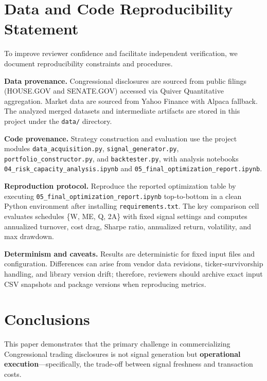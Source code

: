 \documentclass[twocolumn,ieee]{Base_Latex_Template/arithmaxresearch}
\begin{document}
\section{Data and Code Reproducibility Statement}

To improve reviewer confidence and facilitate independent verification, we document reproducibility constraints and procedures.

\textbf{Data provenance.} Congressional disclosures are sourced from public filings (HOUSE.GOV and SENATE.GOV) accessed via Quiver Quantitative aggregation. Market data are sourced from Yahoo Finance with Alpaca fallback. The analyzed merged datasets and intermediate artifacts are stored in this project under the \texttt{data/} directory.

\textbf{Code provenance.} Strategy construction and evaluation use the project modules \texttt{data\_acquisition.py}, \texttt{signal\_generator.py}, \texttt{portfolio\_constructor.py}, and \texttt{backtester.py}, with analysis notebooks \texttt{04\_risk\_capacity\_analysis.ipynb} and \texttt{05\_final\_optimization\_report.ipynb}.

\textbf{Reproduction protocol.} Reproduce the reported optimization table by executing \texttt{05\_final\_optimization\_report.ipynb} top-to-bottom in a clean Python environment after installing \texttt{requirements.txt}. The key comparison cell evaluates schedules \{W, ME, Q, 2A\} with fixed signal settings and computes annualized turnover, cost drag, Sharpe ratio, annualized return, volatility, and max drawdown.

\textbf{Determinism and caveats.} Results are deterministic for fixed input files and configuration. Differences can arise from vendor data revisions, ticker-survivorship handling, and library version drift; therefore, reviewers should archive exact input CSV snapshots and package versions when reproducing metrics.

\section{Conclusions}

This paper demonstrates that the primary challenge in commercializing Congressional trading disclosures is not signal generation but \textbf{operational execution}—specifically, the trade-off between signal freshness and transaction costs.
\end{document}
